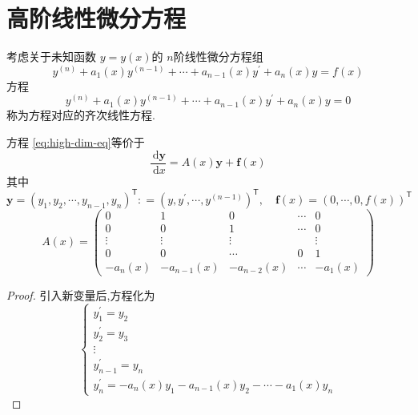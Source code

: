 \documentclass[lang=cn,12pt,color=green,fontset=none]{elegantbook}
\begin{document}
\section{高阶线性微分方程}

考虑关于未知函数 $ y = y\left( x \right)  $的 $ n$阶线性微分方程组 
\begin{equation}\label{eq:high-dim-eq}
    y^{\left( n \right) }+ a_1\left( x \right)y^{\left( n-1 \right) }+ \cdots + a_{n-1}\left( x \right)y^{\prime} + a_{n}\left( x \right)y=f\left( x \right)
\end{equation}方程
\begin{equation}
    y^{\left( n \right) }+ a_1\left( x \right)y^{\left( n-1 \right) }+ \cdots + a_{n-1}\left( x \right)y^{\prime} + a_{n}\left( x \right)y =0
\end{equation}称为方程对应的齐次线性方程.

\begin{theorem}
    方程 \ref{eq:high-dim-eq}等价于
    \begin{equation}
        \frac{\,\mathrm{d} \mathbf{y} }{ \,\mathrm{d} x} = A\left( x \right) \mathbf{y}+  \mathbf{f}\left( x \right)   
    \end{equation}其中 $$
    \mathbf{y}=\left( y_1,y_2,\cdots ,y_{n-1},y_{n} \right)^{\mathsf{T}}: = \left( y,y^{\prime} ,\cdots ,y^{\left( n-1 \right) } \right)^{\mathsf{T}},\quad  \mathbf{f}\left( x \right)=\left( 0,\cdots ,0,f\left( x \right)  \right)^{\mathsf{T}}    
    $$ $$
    A\left( x \right) = \begin{pmatrix} 
        0& 1& 0& \cdots & 0\\ 
         0& 0& 1& \cdots & 0\\ 
          \vdots & \vdots & \vdots & &\vdots \\ 
           0& 0& \cdots & 0& 1\\ 
            -a_{n}\left( x \right)& -a_{n-1}\left( x \right)   & -a_{n-2}\left( x \right) & \cdots & -a_1\left( x \right) 
    \end{pmatrix}  
    $$
\end{theorem}

\begin{proof}
    引入新变量后,方程化为 $$
    \begin{cases} y_1^{\prime} =y_2\\ 
     y_2^{\prime} =y_3\\ 
      \vdots \\ 
       y_{n-1}^{\prime} =y_{n}\\ 
        y_{n}^{\prime} = -a_{n}\left( x \right)y_1-a_{n-1}\left( x \right)y_2-\cdots -a_{1}\left( x \right)y_{n}    \end{cases} 
    $$
\end{proof}
\end{document}
